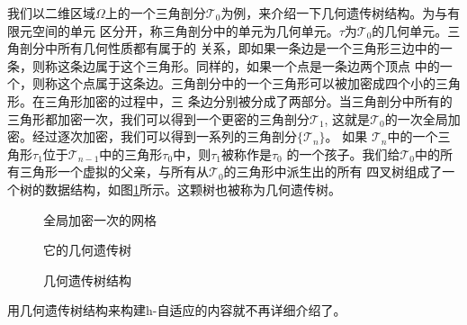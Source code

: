     我们以二维区域$\Omega$上的一个三角剖分$\mathcal{T}_0$为例，来介绍一下几何遗传树结构。为与有限元空间的单元
    区分开，称三角剖分中的单元为几何单元。$\tau$为$\mathcal{T}_0$的几何单元。三角剖分中所有几何性质都有属于的
    关系，即如果一条边是一个三角形三边中的一条，则称这条边属于这个三角形。同样的，如果一个点是一条边两个顶点
    中的一个，则称这个点属于这条边。三角剖分中的一个三角形可以被加密成四个小的三角形。在三角形加密的过程中，三
    条边分别被分成了两部分。当三角剖分中所有的三角形都加密一次，我们可以得到一个更密的三角剖分$\mathcal{T}_1$,
    这就是$\mathcal{T}_0$的一次全局加密。经过逐次加密，我们可以得到一系列的三角剖分$\{ \mathcal{T}_n\}$。 如果
    $\mathcal{T}_n$中的一个三角形$\tau_1$位于$\mathcal{T}_{n-1}$中的三角形$\tau_0$中，则$\tau_1$被称作是$\tau_0$
    的一个孩子。我们给$\mathcal{T}_0$中的所有三角形一个虚拟的父亲，与所有从$\mathcal{T}_0$的三角形中派生出的所有
    四叉树组成了一个树的数据结构，如图\ref{fig::hgrometrytree}所示。这颗树也被称为几何遗传树。
    \begin{figure}[h]
        \begin{minipage}[t]{0.4\textwidth}
          \centering
          \caption{全局加密一次的网格}
        \end{minipage}
        \begin{minipage}[t]{0.6\textwidth}
          \centering
          \caption{它的几何遗传树}
        \end{minipage}
      \caption{几何遗传树结构}
      \label{fig::hgrometrytree}
    \end{figure}
    用几何遗传树结构来构建h-自适应的内容就不再详细介绍了。

